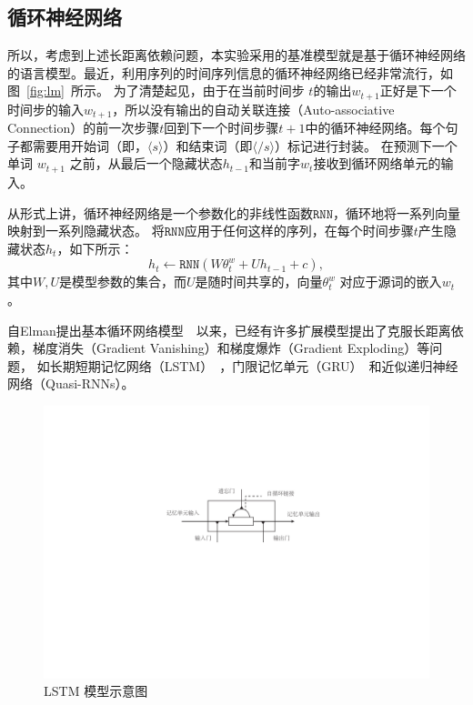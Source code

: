 \subsection{循环神经网络}
所以，考虑到上述长距离依赖问题，本实验采用的基准模型就是基于循环神经网络的语言模型。最近，利用序列的时间序列信息的循环神经网络已经非常流行，如图~\ref{fig:lm}~所示。 为了清楚起见，由于在当前时间步 $ t $的输出$ w_ {t + 1} $正好是下一个时间步的输入$ w_ {t + 1} $，所以没有输出的自动关联连接（Auto-associative Connection）的前一次步骤$ t $回到下一个时间步骤$ t + 1 $中的循环神经网络。每个句子都需要用开始词（即，$ \langle s \rangle $）和结束词（即$ \langle / s \rangle $）标记进行封装。 在预测下一个单词 $ w_ {t + 1} $ 之前，从最后一个隐藏状态$ h_ {t-1} $和当前字$ w_t $接收到循环网络单元的输入。

从形式上讲，循环神经网络是一个参数化的非线性函数$ \mathtt{RNN} $，循环地将一系列向量映射到一系列隐藏状态。 将$ \mathtt{RNN} $应用于任何这样的序列，在每个时间步骤$ t $产生隐藏状态$ h_t $，如下所示：
\begin{equation}
  h_t \leftarrow  \mathtt{RNN}(W\theta^w_t + U h_{t-1} +c),
\end{equation}
其中$ W,U $是模型参数的集合，而$ U $是随时间共享的，向量$ \theta^w_t$ 对应于源词的嵌入$ w_t $。

自Elman提出基本循环网络模型~~以来，已经有许多扩展模型提出了克服长距离依赖，梯度消失（Gradient Vanishing）和梯度爆炸（Gradient Exploding）等问题， 如长期短期记忆网络（LSTM）~，门限记忆单元（GRU）~和近似递归神经网络（Quasi-RNNs）。

\begin{figure}[!ht]
  \centering
  \includegraphics[width=1\linewidth]{./figures/lstm.pdf}
  \caption{LSTM 模型示意图}\label{fig:lstm}
\end{figure}

